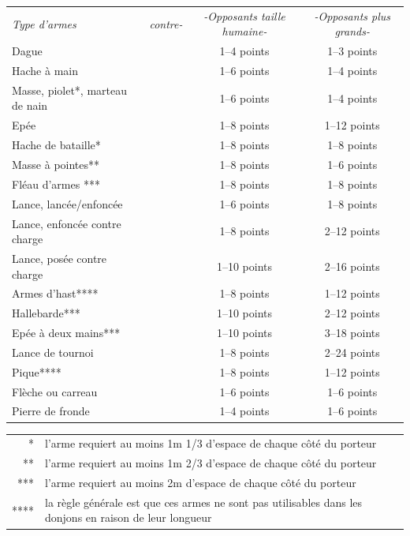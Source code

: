 \begin{tabular}{lccc}
\textit{Type d'armes} & \textit{contre-} & \textit{-Opposants taille humaine-} & \textit{-Opposants plus grands-} \\
Dague                          && 1--4 points  & 1--3 points \\
Hache à main                   && 1--6 points  & 1--4 points \\
Masse, piolet*, marteau de nain && 1--6 points  & 1--4 points \\
Epée                           && 1--8 points  & 1--12 points \\
Hache de bataille*             && 1--8 points  & 1--8 points \\
Masse à pointes**              && 1--8 points  & 1--6 points \\
Fléau d'armes ***              && 1--8 points  & 1--8 points \\
Lance, lancée/enfoncée         && 1--6 points  & 1--8 points \\
Lance, enfoncée contre charge  && 1--8 points  & 2--12 points \\
Lance, posée contre charge     && 1--10 points & 2--16 points \\
Armes d'hast****               && 1--8 points  & 1--12 points \\
Hallebarde***                  && 1--10 points & 2--12 points \\
Epée à deux mains***           && 1--10 points & 3--18 points \\
Lance de tournoi               && 1--8 points  & 2--24 points \\
Pique****                      && 1--8 points  & 1--12 points \\
Flèche ou carreau              && 1--6 points  & 1--6 points \\
Pierre de fronde               && 1--4 points  & 1--6 points \\
\end{tabular}

\begin{tabular}{rp{15cm}}
\multicolumn{1}{r}{*} & l'arme requiert au moins 1m 1/3 d'espace de chaque côté du porteur \\
\multicolumn{1}{r}{**} & l'arme requiert au moins 1m 2/3 d'espace de chaque côté du porteur \\
\multicolumn{1}{r}{***} & l'arme requiert au moins 2m d'espace de chaque côté du porteur \\
\multicolumn{1}{r}{****} & la règle générale est que ces armes ne sont pas utilisables dans les donjons en raison de leur longueur \\
\end{tabular}


